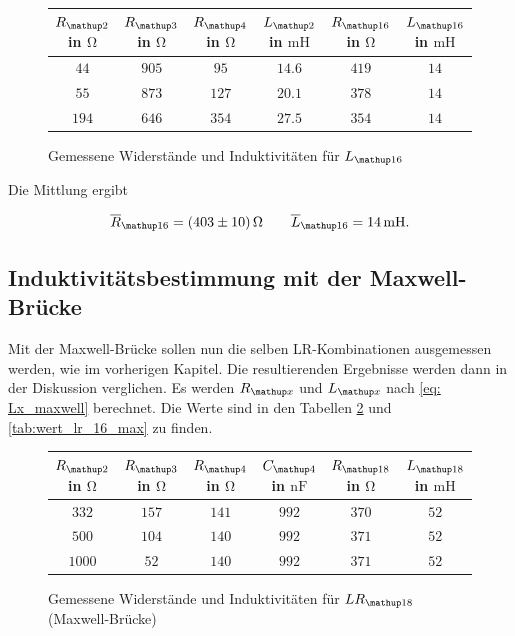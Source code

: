 \begin{figure}
\centering
\caption{Gemessene Widerstände und Induktivitäten für $L\ua{16}$}
  \label{tab:lc_r16}
\begin{tabular}{S S S S S S }
    \toprule
    {$R\ua{2}$  in $\si{\ohm}$} &  {$R\ua{3}$ in $\si{\ohm}$} & {$R\ua{4}$ in $\si{\ohm}$} & {$L\ua{2}$ in $\si{\milli\henry}$}& {$R\ua{16}$ in $\si{\ohm}$} &  {$L\ua{16}$ in $\si{\milli\henry}$} \\
    \midrule
     {$\num{44}$} & {$\num{905}$} &  {$\num{95}$}& {$\num{14,6}$}  &  {$\num{419}$} & {$\num{14}$}\\
     {$\num{55}$} & {$\num{873}$}  & {$\num{127}$} & {$\num{20,1}$} & {$\num{378}$} & {$\num{14}$}\\
     {$\num{194}$} & {$\num{646}$}  & {$\num{354}$} & {$\num{27,5}$} &{$\num{354}$} & {$\num{14}$}  \\
    \bottomrule
  \end{tabular}
 \end{figure}

Die Mittlung ergibt

\begin{equation}
\label{eq:wert_r16_l_16}
\overline{R}_{\map{16}}=\SI{403\pm10}{\ohm} \qquad \overline{L}_{\map{16}}=\SI{14}{\milli\henry}.
\end{equation}

\subsection{Induktivitätsbestimmung mit der Maxwell-Brücke}

Mit der Maxwell-Brücke sollen nun die selben LR-Kombinationen ausgemessen werden, wie %
im vorherigen Kapitel.
Die resultierenden Ergebnisse werden dann in der Diskussion verglichen.
Es werden $R\ua{x}$ und $L\ua{x}$ nach \eqref{eq: Lx_maxwell} berechnet.
Die Werte sind in den Tabellen \ref{tab:lc_r18_max} und \ref{tab:wert_lr_16_max} zu finden.

\begin{figure}
\centering
\caption{Gemessene Widerstände und Induktivitäten für $LR\ua{18}$ (Maxwell-Brücke)}
  \label{tab:lc_r18_max}
\begin{tabular}{S S S S S S }
    \toprule
    {$R\ua{2}$  in $\si{\ohm}$} &  {$R\ua{3}$ in $\si{\ohm}$} & {$R\ua{4}$ in $\si{\ohm}$} & {$C\ua{4}$ in $\si{\nano\farad}$}& {$R\ua{18}$ in $\si{\ohm}$} &  {$L\ua{18}$ in $\si{\milli\henry}$} \\
    \midrule
     {$\num{332}$} & {$\num{157}$} &  {$\num{141}$}& {$\num{992}$}  &  {$\num{370}$} & {$\num{52}$}\\
     {$\num{500}$} & {$\num{104}$}  & {$\num{140}$} & {$\num{992}$} & {$\num{371}$} & {$\num{52}$}\\
     {$\num{1000}$} & {$\num{52}$}  & {$\num{140}$} & {$\num{992}$} &{$\num{371}$} & {$\num{52}$}  \\
    \bottomrule
  \end{tabular}
 \end{figure}


